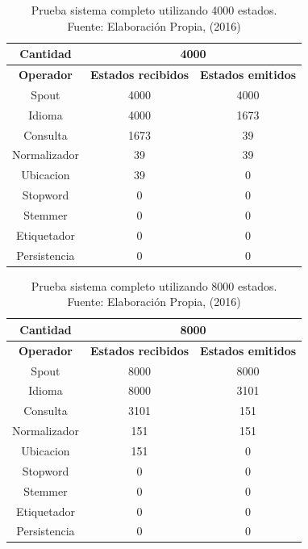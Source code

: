\begin{table}[H]
\centering
\caption[Prueba sistema completo utilizando 4000 estados.]{Prueba sistema completo utilizando 4000 estados.\\Fuente: Elaboración Propia, (2016)}
\label{PruebaSistFull4000}
\begin{tabular}{|c|c|c|}
\hline
\textbf{Cantidad} & \multicolumn{2}{c|}{\textbf{4000}} \\ \hline
\textbf{Operador} & \multicolumn{1}{c|}{\textbf{Estados recibidos}} & \multicolumn{1}{c|}{\textbf{Estados emitidos}} \\ \hline
Spout & 4000 & 4000 \\ \hline
Idioma & 4000 & 1673 \\ \hline
Consulta & 1673 & 39 \\ \hline
Normalizador & 39 & 39 \\ \hline
Ubicacion & 39 & 0 \\ \hline
Stopword & 0 & 0 \\ \hline
Stemmer & 0 & 0 \\ \hline
Etiquetador & 0 & 0 \\ \hline
Persistencia & 0 & 0 \\ \hline
\end{tabular}
\end{table}

\begin{table}[H]
\centering
\caption[Prueba sistema completo utilizando 8000 estados.]{Prueba sistema completo utilizando 8000 estados.\\Fuente: Elaboración Propia, (2016)}
\label{PruebaSistFull8000}
\begin{tabular}{|c|c|c|}
\hline
\textbf{Cantidad} & \multicolumn{2}{c|}{\textbf{8000}} \\ \hline
\textbf{Operador} & \multicolumn{1}{c|}{\textbf{Estados recibidos}} & \multicolumn{1}{c|}{\textbf{Estados emitidos}} \\ \hline
Spout & 8000 & 8000 \\ \hline
Idioma & 8000 & 3101 \\ \hline
Consulta & 3101 & 151 \\ \hline
Normalizador & 151 & 151 \\ \hline
Ubicacion & 151 & 0 \\ \hline
Stopword & 0 & 0 \\ \hline
Stemmer & 0 & 0 \\ \hline
Etiquetador & 0 & 0 \\ \hline
Persistencia & 0 & 0 \\ \hline
\end{tabular}
\end{table}

